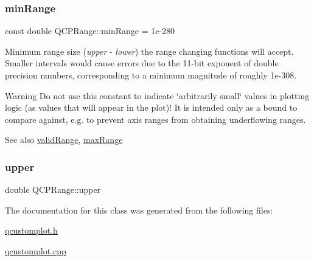 \subsubsection{\texorpdfstring{min\+Range}{minRange}}
{\footnotesize\ttfamily const double Q\+C\+P\+Range\+::min\+Range = 1e-\/280\hspace{0.3cm}{\ttfamily [static]}}

Minimum range size ({\itshape upper} -\/ {\itshape lower}) the range changing functions will accept. Smaller intervals would cause errors due to the 11-\/bit exponent of double precision numbers, corresponding to a minimum magnitude of roughly 1e-\/308.

\begin{DoxyWarning}{Warning}
Do not use this constant to indicate \char`\"{}arbitrarily small\char`\"{} values in plotting logic (as values that will appear in the plot)! It is intended only as a bound to compare against, e.\+g. to prevent axis ranges from obtaining underflowing ranges.
\end{DoxyWarning}
\begin{DoxySeeAlso}{See also}
\hyperlink{class_q_c_p_range_ab38bd4841c77c7bb86c9eea0f142dcc0}{valid\+Range}, \hyperlink{class_q_c_p_range_a5ca51e7a2dc5dc0d49527ab171fe1f4f}{max\+Range} 
\end{DoxySeeAlso}
\mbox{\label{class_q_c_p_range_ae44eb3aafe1d0e2ed34b499b6d2e074f}} 
\subsubsection{\texorpdfstring{upper}{upper}}
{\footnotesize\ttfamily double Q\+C\+P\+Range\+::upper}



The documentation for this class was generated from the following files\+:\begin{DoxyCompactItemize}
\item 
\hyperlink{qcustomplot_8h}{qcustomplot.\+h}\item 
\hyperlink{qcustomplot_8cpp}{qcustomplot.\+cpp}\end{DoxyCompactItemize}
